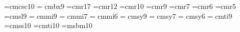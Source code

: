 
\overfullrule 0pt
\def\conf{{StMalo2\ }}
\def\macname{{malo2}}

\magnification{}
\hsize 4.43in
\vsize 7.28in



\font\cmsc=cmcsc10 %
\font\bfab = cmbx9
\font\fa=cmr17
\font\fb=cmr12
\font\fc=cmr10
\font\fab=cmr9
\font\sfab=cmr7
\font\fs=cmr6
\font\fd=cmr5
\font\slab=cmsl9
\font\tab= cmmi9
\font\sab= cmmi7
\font\ssab= cmmi6
\font\abst= cmsy9
\font\sabs= cmsy7
\font\ssabs= cmsy6
\font\itab= cmti9
\font\dfont=cmss10
\font\efont=cmti10
\font\Bbb=msbm10


\def\figfont{
    \textfont0 = \fab
    \scriptfont0 = \sfab
    \scriptscriptfont0 = \fs
    \textfont1 = \tab
    \scriptfont1 = \sab
    \scriptscriptfont1 = \ssab
    \textfont2 = \abst
    \scriptfont2 = \sabs
    \scriptscriptfont2 = \ssabs
    \let \sl = \slab
    \let \bf = \bfab
    \let \it = \itab
    \baselineskip 9pt
    \fab}


\def\CC{{\rm C\kern-.18cm\vrule width.6pt height 6pt depth-.2pt
\kern.18cm}}

\def\NN{{\mathop{{\rm I}\kern-.2em{\rm N}}\nolimits}}

\def\PP{{\mathop{{\rm I}\kern-.2em{\rm P}}\nolimits}}

\def\RR{{\mathop{{\rm I}\kern-.2em{\rm R}}\nolimits}}

\def\RRt{{\fa I}\kern-.2em{\fa R}}

\def\TT{\hbox{{\Bbb{T}}}}

\def\ZZ{{\mathop{{\rm Z}\kern-.28em{\rm Z}}\nolimits}}

